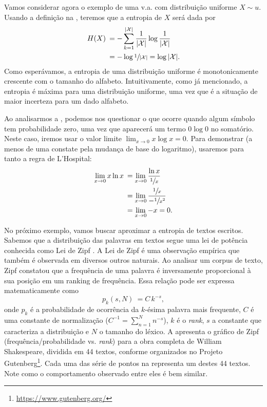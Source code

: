 Vamos considerar agora o exemplo de uma v.a. com distribuição uniforme $X \sim u$.
Usando a definição na , teremos que a entropia de $X$ será dada por
\begin{subequations}\label{eq:entropy-uniform}
\begin{align}
    H(X) \: &= - \sum_{k=1}^{\vert \mathcal{X} \vert} \frac{1}{\vert \mathcal{X} \vert} \log \frac{1}{\vert \mathcal{X} \vert} \\
            &= - \log \sfrac{1}{\vert \mathcal{X} \vert} = \log \vert \mathcal{X} \vert .
\end{align}
\end{subequations}
Como esperávamos, a entropia de uma distribuição uniforme é monotonicamente
crescente com o tamanho do alfabeto. Intuitivamente, como já mencionado,
a entropia é máxima para uma distribuição uniforme, uma vez que é a situação
de maior incerteza para um dado alfabeto.

Ao analisarmos a , podemos nos questionar o que ocorre
quando algum símbolo tem probabilidade zero, uma vez que aparecerá um termo
$0 \log 0$ no somatório. Neste caso, iremos usar o valor limite $\lim_{x \rightarrow 0} x \log x = 0$.
Para demonstrar (a menos de uma constate pela mudança de base do logaritmo), 
usaremos para tanto a regra de L'Hospital:
\begin{subequations}\label{eq:0log0}
\begin{align}
    \lim_{x \rightarrow 0} x \ln x \: &= \lim_{x \rightarrow 0} \frac{\ln x}{\sfrac{1}{x}} \\
				    &= \lim_{x \rightarrow 0} \frac{\sfrac{1}{x}}{-\sfrac{1}{x^2}} \\
				    &= \lim_{x \rightarrow 0} -x = 0.
\end{align}
\end{subequations}

No próximo exemplo, vamos buscar aproximar a entropia de textos escritos.
Sabemos que a distribuição das palavras em textos segue uma lei de potência
conhecida como Lei de Zipf
\cite{zipf1935,zipf1949,FerreriCancho2001,araujo2013}.  A Lei de Zipf é uma
observação empírica que também é observada em diversos outros naturais.  Ao
analisar um corpus de texto, Zipf constatou que a frequência de uma palavra é
inversamente proporcional à sua posição em um ranking de frequência.  Essa
relação pode ser expressa matematicamente como 
\begin{equation}\label{eq:zipf}
    p_k(s, N) \: = C \, k^{-s},
\end{equation}
onde $p_k$ é a probabilidade de ocorrência da $k$-ésima palavra mais frequente,
$C$ é uma constante de normalização ($C^{-1} = \sum_{n=1}^N n^{-s}$), $k$ é o
\emph{rank}, $s$ a constante que caracteriza a distribuição e $N$ o tamanho do
léxico. A  apresenta o gráfico de Zipf
(frequência/probabilidade vs. \emph{rank}) para a obra completa de William
Shakespeare, dividida em 44 textos, conforme organizados no Projeto
Gutenberg\footnote{\url{https://www.gutenberg.org/}}.  Cada uma das série de pontos na
 representa um destes 44 textos.  Note como o
comportamento observado entre eles é bem similar.

